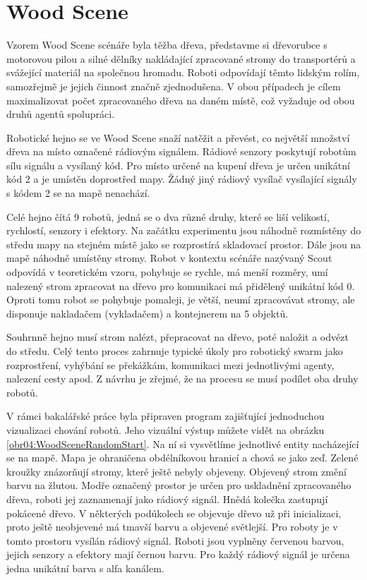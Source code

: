 \section{Wood Scene}
Vzorem Wood Scene scénáře byla těžba dřeva, představme si dřevorubce s motorovou pilou a silné dělníky nakládající zpracované stromy do transportérů a svážející materiál na společnou hromadu. Roboti odpovídají těmto lidským rolím, samozřejmě je jejich činnost značně zjednodušena. V obou případech je cílem maximalizovat počet zpracovaného dřeva na daném místě, což vyžaduje od obou druhů agentů spolupráci. \par
Robotické hejno se ve Wood Scene snaží natěžit a převést, co největší množství dřeva na místo označené rádiovým signálem. Rádiové senzory poskytují robotům sílu signálu a vysílaný kód. Pro místo určené na kupení dřeva je určen unikátní kód 2 a je umístěn doprostřed mapy. Žádný jiný rádiový vysílač vysílající signály s kódem 2 se na mapě nenachází.  
\par
Celé hejno čítá 9 robotů, jedná se o dva různé druhy, které se liší velikostí, rychlostí, senzory i efektory. Na začátku experimentu jsou náhodně rozmístěny do středu mapy na stejném místě jako se rozprostírá skladovací prostor. Dále jsou na mapě náhodně umístěny stromy. Robot v kontextu scénáře nazývaný Scout odpovídá  v teoretickém vzoru, pohybuje se rychle, má menší rozměry, umí nalezený strom zpracovat na dřevo pro komunikaci má přidělený unikátní kód 0. Oproti tomu robot  se pohybuje pomaleji, je větší, neumí zpracovávat stromy, ale disponuje nakladačem (vykladačem) a kontejnerem na 5 objektů. 
 \par 
Souhrnně hejno musí strom nalézt, přepracovat na dřevo, poté naložit a odvézt do středu. Celý tento proces zahrnuje typické úkoly pro robotický swarm jako rozprostření, vyhýbání se překážkám, komunikaci mezi jednotlivými agenty, nalezení cesty apod. Z návrhu je zřejmé, že na procesu se musí podílet oba druhy robotů.
\par
V rámci bakalářské práce byla připraven program zajišťující jednoduchou vizualizaci chování robotů. Jeho vizuální výstup můžete vidět na obrázku \ref{obr04:WoodSceneRandomStart}. Na ní si vysvětlíme jednotlivé entity nacházející se na mapě. Mapa je ohraničena obdélníkovou hranicí a chová se jako zeď. Zelené kroužky znázorňují stromy, které ještě nebyly objeveny. Objevený strom změní barvu na žlutou. Modře označený prostor je určen pro uskladnění zpracovaného dřeva, roboti jej zaznamenají jako rádiový signál. Hnědá kolečka zastupují pokácené dřevo. V některých podúkolech se objevuje dřevo už při inicializaci, proto ještě neobjevené má tmavší barvu a objevené světlejší. Pro roboty je v tomto prostoru vysílán rádiový signál. Roboti jsou vyplněny červenou barvou, jejich senzory a efektory mají černou barvu. Pro každý rádiový signál je určena jedna unikátní barva s alfa kanálem. 
